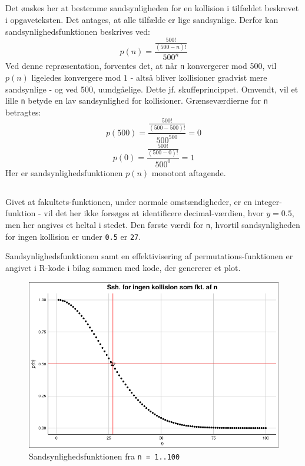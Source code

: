 \documentclass[a4paper,10pt]{article}
\begin{document}
\subsection{}
Det ønskes her at bestemme sandsynligheden for en kollision i tilfældet beskrevet i opgaveteksten. Det antages, at alle tilfælde er lige sandsynlige. Derfor kan sandsynlighedsfunktionen beskrives ved:
$$
p(n) = \frac{\frac{500!}{(500-n)!}}{500^n}
$$
Ved denne repræsentation, forventes det, at når \texttt{n} konvergerer mod 500, vil $p(n)$ ligeledes konvergere mod $1$ - altså bliver kollisioner gradvist mere sandsynlige - og ved 500, uundgåelige. Dette jf. skuffeprincippet. Omvendt, vil et lille \texttt{n} betyde en lav sandsynlighed for kollisioner. 
Grænseværdierne for \texttt{n} betragtes:
$$
p(500) = \frac{\frac{500!}{(500-500)!}}{500^{500}} = 0
$$
$$
p(0) = \frac{\frac{500!}{(500-0)!}}{500^0} = 1
$$
Her er sandsynlighedsfunktionen $p(n)$ monotont aftagende.

\newpage

\subsection{}
Givet at fakultets-funktionen, under normale omstændigheder, er en integer-funktion - vil det her ikke forsøges at identificere decimal-værdien, hvor $y = 0.5$, men her angives et heltal i stedet. Den første værdi for \texttt{n}, hvortil sandsynligheden for ingen kollision er under \texttt{0.5} er \texttt{27}.

Sandsynlighedsfunktionen samt en effektivisering af permutations-funktionen er angivet i R-kode i bilag sammen med kode, der genererer et plot. 

\begin{figure}[H]
\centering
\caption{Sandsynlighedsfunktionen fra \texttt{n = 1..100}}
\includegraphics[scale = 0.45]{plot.png}
\end{figure}
\end{document}
